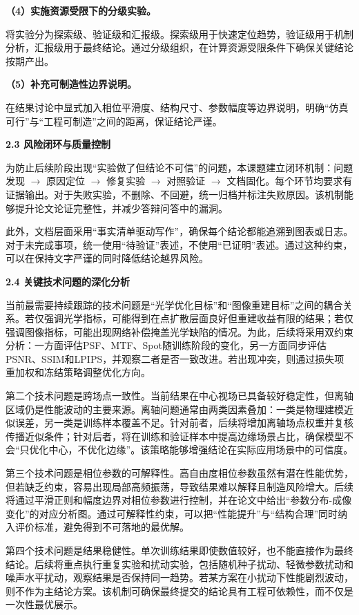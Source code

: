 \documentclass[UTF8,12pt,fontset=fandol]{ctexart}
\newcommand{\hfirst}[1]{%
\vspace{0.6em}
\noindent\textbf{#1}\par
}
\newcommand{\subh}[1]{%
\vspace{0.4em}
\noindent\textbf{#1}\par
}
\begin{document}
\subh{（4）实施资源受限下的分级实验。}
将实验分为探索级、验证级和汇报级。探索级用于快速定位趋势，验证级用于机制分析，汇报级用于最终结论。通过分级组织，在计算资源受限条件下确保关键结论按期产出。

\subh{（5）补充可制造性边界说明。}
在结果讨论中显式加入相位平滑度、结构尺寸、参数幅度等边界说明，明确“仿真可行”与“工程可制造”之间的距离，保证结论严谨。

\hfirst{2.3 风险闭环与质量控制}
为防止后续阶段出现“实验做了但结论不可信”的问题，本课题建立闭环机制：问题发现 $\rightarrow$ 原因定位 $\rightarrow$ 修复实验 $\rightarrow$ 对照验证 $\rightarrow$ 文档固化。每个环节均要求有证据输出。对于失败实验，不删除、不回避，统一归档并标注失败原因。该机制能够提升论文论证完整性，并减少答辩问答中的漏洞。

此外，文档层面采用“事实清单驱动写作”，确保每个结论都能追溯到图表或日志。对于未完成事项，统一使用“待验证”表述，不使用“已证明”表述。通过这种约束，可以在保持文字严谨的同时降低结论越界风险。

\hfirst{2.4 关键技术问题的深化分析}
当前最需要持续跟踪的技术问题是“光学优化目标”和“图像重建目标”之间的耦合关系。若仅强调光学指标，可能得到在点扩散层面良好但重建收益有限的结果；若仅强调图像指标，可能出现网络补偿掩盖光学缺陷的情况。为此，后续将采用双约束分析：一方面评估PSF、MTF、Spot随训练阶段的变化，另一方面同步评估PSNR、SSIM和LPIPS，并观察二者是否一致改进。若出现冲突，则通过损失项重加权和冻结策略调整优化方向。

第二个技术问题是跨场点一致性。当前结果在中心视场已具备较好稳定性，但离轴区域仍是性能波动的主要来源。离轴问题通常由两类因素叠加：一类是物理建模近似误差，另一类是训练样本覆盖不足。针对前者，后续将增加离轴场点权重并复核传播近似条件；针对后者，将在训练和验证样本中提高边缘场景占比，确保模型不会“只优化中心，不优化边缘”。该策略能够增强结论在实际应用场景中的可信度。

第三个技术问题是相位参数的可解释性。高自由度相位参数虽然有潜在性能优势，但若缺乏约束，容易出现局部高频振荡，导致结果难以解释且制造风险增大。后续将通过平滑正则和幅度边界对相位参数进行控制，并在论文中给出“参数分布-成像变化”的对应分析图。通过可解释性约束，可以把“性能提升”与“结构合理”同时纳入评价标准，避免得到不可落地的最优解。

第四个技术问题是结果稳健性。单次训练结果即使数值较好，也不能直接作为最终结论。后续将重点执行重复实验和扰动实验，包括随机种子扰动、轻微参数扰动和噪声水平扰动，观察结果是否保持同一趋势。若某方案在小扰动下性能剧烈波动，则不作为主结论方案。该机制可确保最终提交的结论具有工程可依赖性，而不仅是一次性最优展示。
\end{document}
